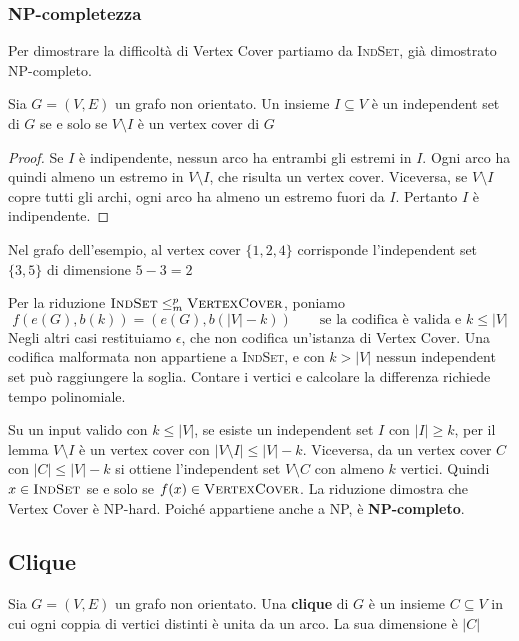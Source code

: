 \subsubsection*{NP-completezza}
Per dimostrare la difficoltà di Vertex Cover partiamo da
\textsc{IndSet}, già dimostrato NP-completo.

\medskip
\noindent
\colorbox{SALZO}{\parbox{\dimexpr\linewidth-2\fboxsep}{
\begin{lemma}
    Sia $G=(V,E)$ un grafo non orientato. Un insieme
    $I\subseteq V$ è un independent set di $G$ se e solo se
    $V\setminus I$ è un vertex cover di $G$
\end{lemma}
}}%

\begin{proof}
    Se $I$ è indipendente, nessun arco ha entrambi gli estremi
    in $I$. Ogni arco ha quindi almeno un estremo in
    $V\setminus I$, che risulta un vertex cover. Viceversa,
    se $V\setminus I$ copre tutti gli archi, ogni arco ha
    almeno un estremo fuori da $I$. Pertanto $I$ è indipendente.
\end{proof}

\noindent
Nel grafo dell'esempio, al vertex cover $\{1,2,4\}$ corrisponde
l'independent set $\{3,5\}$ di dimensione $5-3=2$

\medskip
\noindent
Per la riduzione $\textsc{IndSet}\le_m^p\textsc{VertexCover}$,
poniamo
\[
    f(e(G),b(k))=(e(G),b(|V|-k))
    \qquad\text{se la codifica è valida e } k\le |V|
\]
Negli altri casi restituiamo $\epsilon$, che non codifica
un'istanza di Vertex Cover. Una codifica malformata non appartiene
a \textsc{IndSet}, e con $k>|V|$ nessun independent set può
raggiungere la soglia. Contare i vertici e calcolare la differenza
richiede tempo polinomiale.

\medskip
\noindent
Su un input valido con $k\le |V|$, se esiste un independent
set $I$ con $|I|\ge k$, per il lemma $V\setminus I$ è un vertex
cover con $|V\setminus I|\le |V|-k$. Viceversa, da un vertex cover
$C$ con $|C|\le |V|-k$ si ottiene l'independent set $V\setminus C$
con almeno $k$ vertici. Quindi $x\in\textsc{IndSet}$ se e solo se
$f(x)\in\textsc{VertexCover}$. La riduzione dimostra che Vertex Cover
è NP-hard. Poiché appartiene anche a NP, è \textbf{NP-completo}.

\subsection{Clique}
\noindent
\colorbox{SALZO}{\parbox{\dimexpr\linewidth-2\fboxsep}{
\begin{definition}[Clique]
    Sia $G=(V,E)$ un grafo non orientato. Una \textbf{clique}
    di $G$ è un insieme $C\subseteq V$ in cui ogni coppia di
    vertici distinti è unita da un arco. La sua dimensione è $|C|$
\end{definition}
}}%

